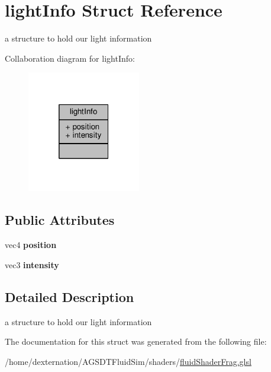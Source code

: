 \hypertarget{structlight_info}{\section{light\-Info Struct Reference}
\label{structlight_info}
}


a structure to hold our light information  




Collaboration diagram for light\-Info\-:\nopagebreak
\begin{figure}[H]
\begin{center}
\leavevmode
\includegraphics[width=140pt]{structlight_info__coll__graph}
\end{center}
\end{figure}
\subsection*{Public Attributes}
\begin{DoxyCompactItemize}
\item 
\hypertarget{structlight_info_a91464db499bb017224ed4137db3ad357}{vec4 {\bfseries position}}\label{structlight_info_a91464db499bb017224ed4137db3ad357}

\item 
\hypertarget{structlight_info_a0a3a282dd8998aed665222fd1902611f}{vec3 {\bfseries intensity}}\label{structlight_info_a0a3a282dd8998aed665222fd1902611f}

\end{DoxyCompactItemize}


\subsection{Detailed Description}
a structure to hold our light information 

The documentation for this struct was generated from the following file\-:\begin{DoxyCompactItemize}
\item 
/home/dexternation/\-A\-G\-S\-D\-T\-Fluid\-Sim/shaders/\hyperlink{fluid_shader_frag_8glsl}{fluid\-Shader\-Frag.\-glsl}\end{DoxyCompactItemize}
